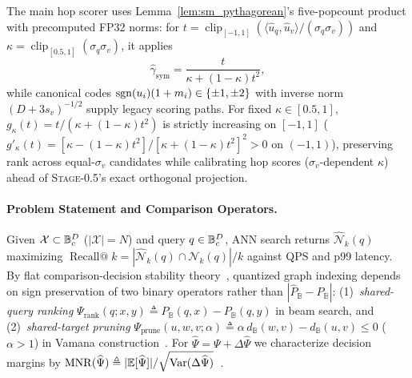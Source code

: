 The main hop scorer uses Lemma~\ref{lem:sm_pythagorean}'s five-popcount product with precomputed FP32 norms: for $t = \operatorname{clip}_{[-1,1]}(\langle \hat{u}_q, \hat{u}_v\rangle / (\sigma_q\sigma_v))$ and $\kappa = \operatorname{clip}_{[0.5,1]}(\sigma_q\sigma_v)$, it applies
\begin{equation}
  \hat{\gamma}_{\mathrm{sym}} = \frac{t}{\kappa + (1 - \kappa)t^2},
  \label{eq:sm_calibration}
\end{equation}
while canonical codes $\operatorname{sgn}(u_i)(1 + m_i) \in \{\pm 1, \pm 2\}$ with inverse norm $(D + 3 s_v)^{-1/2}$ supply legacy scoring paths. For fixed $\kappa \in [0.5, 1]$, $g_\kappa(t) = t / (\kappa + (1 - \kappa)t^2)$ is strictly increasing on $[-1, 1]$ ($g'_\kappa(t) = [\kappa - (1 - \kappa)t^2] / [\kappa + (1 - \kappa)t^2]^2 > 0$ on $(-1, 1)$), preserving rank across equal-$\sigma_v$ candidates while calibrating hop scores ($\sigma_v$-dependent $\kappa$) ahead of \textsc{Stage-0.5}'s exact orthogonal projection.

\paragraph{Problem Statement and Comparison Operators.}
Given $\mathcal{X} \subset \mathbb{B}_c^D$ ($|\mathcal{X}| = N$) and query $q \in \mathbb{B}_c^D$, {ANN} search returns $\widehat{\mathcal{N}}_k(q)$ maximizing $\operatorname{Recall@}k = |\widehat{\mathcal{N}}_k(q) \cap \mathcal{N}_k(q)| / k$ against {QPS} and p99 latency.
By flat comparison-decision stability theory~\cite{xiao2026decisions}, quantized graph indexing depends on sign preservation of two binary operators rather than $|\widehat{P}_{\mathbb{B}} - P_{\mathbb{B}}|$:
(1)~\emph{shared-query ranking} $\Psi_{\mathrm{rank}}(q; x, y) \triangleq P_{\mathbb{B}}(q, x) - P_{\mathbb{B}}(q, y)$ in beam search, and
(2)~\emph{shared-target pruning} $\Psi_{\mathrm{prune}}(u, w, v; \alpha) \triangleq \alpha\,d_{\mathbb{B}}(w, v) - d_{\mathbb{B}}(u, v) \le 0$ ($\alpha > 1$) in {Vamana} construction~\cite{subramanya2019diskann}. For $\widehat{\Psi} = \Psi + \Delta\widehat{\Psi}$ we characterize decision margins by $\mathrm{MNR}(\widehat{\Psi}) \triangleq |\mathbb{E}[\widehat{\Psi}]| / \sqrt{\operatorname{Var}(\Delta\widehat{\Psi})}$~\cite{xiao2026decisions}.
